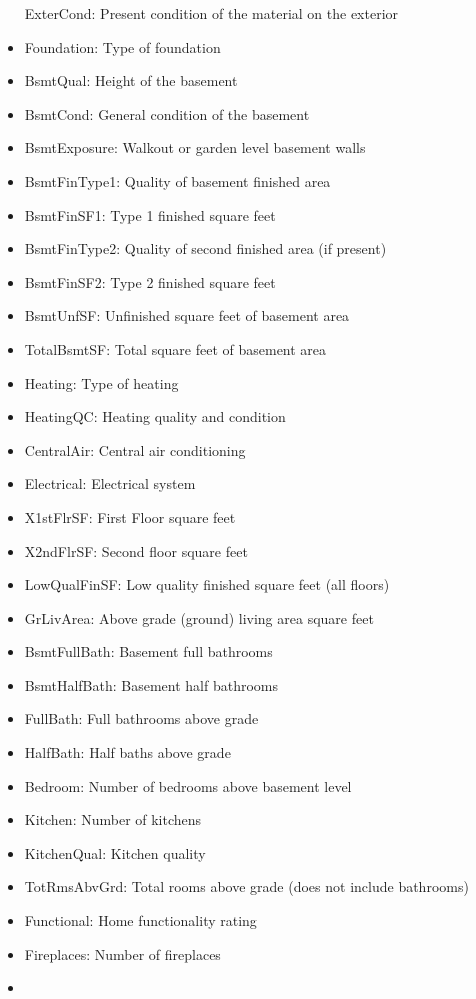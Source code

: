 \documentclass[]{article}
\begin{document}
\begin{itemize}
  ExterCond: Present condition of the material on the exterior
\item
  Foundation: Type of foundation
\item
  BsmtQual: Height of the basement
\item
  BsmtCond: General condition of the basement
\item
  BsmtExposure: Walkout or garden level basement walls
\item
  BsmtFinType1: Quality of basement finished area
\item
  BsmtFinSF1: Type 1 finished square feet
\item
  BsmtFinType2: Quality of second finished area (if present)
\item
  BsmtFinSF2: Type 2 finished square feet
\item
  BsmtUnfSF: Unfinished square feet of basement area
\item
  TotalBsmtSF: Total square feet of basement area
\item
  Heating: Type of heating
\item
  HeatingQC: Heating quality and condition
\item
  CentralAir: Central air conditioning
\item
  Electrical: Electrical system
\item
  X1stFlrSF: First Floor square feet
\item
  X2ndFlrSF: Second floor square feet
\item
  LowQualFinSF: Low quality finished square feet (all floors)
\item
  GrLivArea: Above grade (ground) living area square feet
\item
  BsmtFullBath: Basement full bathrooms
\item
  BsmtHalfBath: Basement half bathrooms
\item
  FullBath: Full bathrooms above grade
\item
  HalfBath: Half baths above grade
\item
  Bedroom: Number of bedrooms above basement level
\item
  Kitchen: Number of kitchens
\item
  KitchenQual: Kitchen quality
\item
  TotRmsAbvGrd: Total rooms above grade (does not include bathrooms)
\item
  Functional: Home functionality rating
\item
  Fireplaces: Number of fireplaces
\item

\end{itemize}
\end{document}
